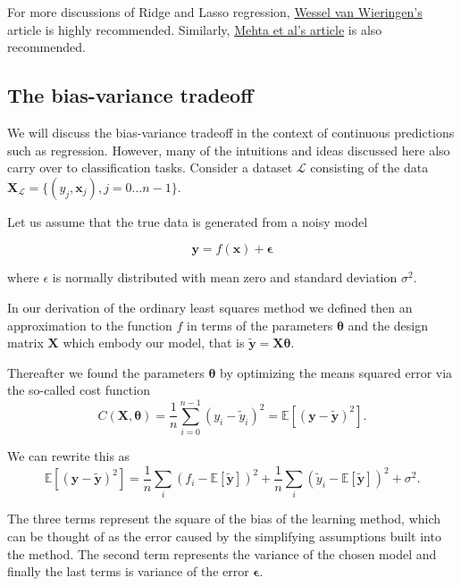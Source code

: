 \documentclass[%
oneside,                 %
final,                   %
10pt]{article}
\begin{document}
For more discussions of Ridge and Lasso regression, \href{{https://arxiv.org/abs/1509.09169}}{Wessel van Wieringen's} article is highly recommended.
Similarly, \href{{https://arxiv.org/abs/1803.08823}}{Mehta et al's article} is also recommended.

\subsection{The bias-variance tradeoff}

We will discuss the bias-variance tradeoff in the context of
continuous predictions such as regression. However, many of the
intuitions and ideas discussed here also carry over to classification
tasks. Consider a dataset $\mathcal{L}$ consisting of the data
$\mathbf{X}_\mathcal{L}=\{(y_j, \boldsymbol{x}_j), j=0\ldots n-1\}$. 

Let us assume that the true data is generated from a noisy model

\[
\bm{y}=f(\boldsymbol{x}) + \bm{\epsilon}
\]

where $\epsilon$ is normally distributed with mean zero and standard deviation $\sigma^2$.

In our derivation of the ordinary least squares method we defined then
an approximation to the function $f$ in terms of the parameters
$\bm{\theta}$ and the design matrix $\bm{X}$ which embody our model,
that is $\bm{\tilde{y}}=\bm{X}\bm{\theta}$. 

Thereafter we found the parameters $\bm{\theta}$ by optimizing the means squared error via the so-called cost function
\[
C(\bm{X},\bm{\theta}) =\frac{1}{n}\sum_{i=0}^{n-1}(y_i-\tilde{y}_i)^2=\mathbb{E}\left[(\bm{y}-\bm{\tilde{y}})^2\right].
\]

We can rewrite this as 
\[
\mathbb{E}\left[(\bm{y}-\bm{\tilde{y}})^2\right]=\frac{1}{n}\sum_i(f_i-\mathbb{E}\left[\bm{\tilde{y}}\right])^2+\frac{1}{n}\sum_i(\tilde{y}_i-\mathbb{E}\left[\bm{\tilde{y}}\right])^2+\sigma^2.
\]

The three terms represent the square of the bias of the learning
method, which can be thought of as the error caused by the simplifying
assumptions built into the method. The second term represents the
variance of the chosen model and finally the last terms is variance of
the error $\bm{\epsilon}$.
\end{document}
